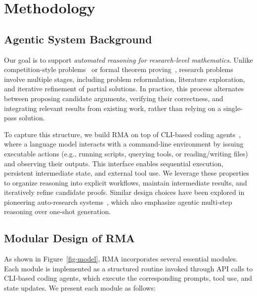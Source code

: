 \documentclass{article}
\newcommand{\modelname}{\textsc{RMA}\xspace}
\begin{document}
\vspace{-10pt}
\section{Methodology}
\label{sec-methodology}
\vspace{-7pt}
\subsection{Agentic System Background}
\vspace{-5pt}

Our goal is to support \emph{automated reasoning for research-level mathematics}. Unlike competition-style problems~\citep{trinh2024alphageometry} or formal theorem proving~\citep{Lean4}, research problems involve multiple stages, including problem reformulation, literature exploration, and iterative refinement of partial solutions. In practice, this process alternates between proposing candidate arguments, verifying their correctness, and integrating relevant results from existing work, rather than relying on a single-pass solution.

To capture this structure, we build \modelname on top of CLI-based coding agents~\citep{openai_codex,anthropic_claude_code,google_geminicli}, where a language model interacts with a command-line environment by issuing executable actions (e.g., running scripts, querying tools, or reading/writing files) and observing their outputs. This interface enables sequential execution, persistent intermediate state, and external tool use. We leverage these properties to organize reasoning into explicit workflows, maintain intermediate results, and iteratively refine candidate proofs. Similar design choices have been explored in pioneering auto-research systems~\cite{zimmer2026agenticresearcherpracticalguide,karpathy_autoresearch}, which also emphasize agentic multi-step reasoning over one-shot generation.
\vspace{-5pt}
\subsection{Modular Design of \modelname}
\label{sec-modular}
\vspace{-5pt}
As shown in Figure~\ref{fig-model}, \modelname incorporates several essential modules. Each module is implemented as a structured routine invoked through API calls to CLI-based coding agents, which execute the corresponding prompts, tool use, and state updates. We present each module as follows:
\vspace{-7pt}
\end{document}
